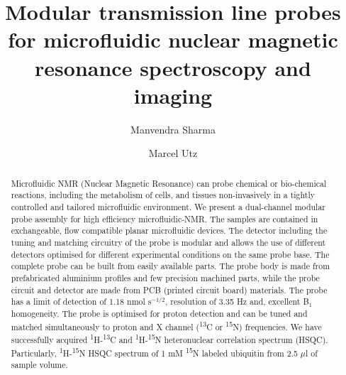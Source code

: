 \documentclass[preprint,5p]{elsarticle}
\begin{document}
\title{Modular transmission line probes for microfluidic nuclear magnetic resonance spectroscopy and imaging}
\author[1]{Manvendra Sharma}
\author[1]{Marcel Utz}
\address[1]{School of Chemistry, University of Southampton, Southampton SO17 1BJ, United Kingdom}
\begin{abstract}
Microfluidic NMR (Nuclear Magnetic Resonance) can probe chemical or bio-chemical reactions, including the metabolism of cells, and tissues non-invasively in a tightly controlled and tailored microfluidic environment. We present a dual-channel modular probe assembly for  high efficiency microfluidic-NMR. The samples are contained in exchangeable, flow compatible planar microfluidic devices. The detector including the tuning and matching circuitry of the probe is modular and allows the use of different detectors optimised for different experimental conditions on the same probe base. The complete probe can be built from easily available parts. The probe body is made from prefabricated aluminium profiles and few precision machined parts, while the probe circuit and detector are made from PCB (printed circuit board) materials. The probe has a limit of detection of 1.18 nmol s$^{-1/2}$, resolution of 3.35 Hz and, excellent B$_{1}$ homogeneity. The probe is optimised for proton detection and can be tuned and matched simultaneously to proton and X channel (\textsuperscript{13}C or \textsuperscript{15}N) frequencies. We have successfully acquired \textsuperscript{1}H-\textsuperscript{13}C and \textsuperscript{1}H-\textsuperscript{15}N heteronuclear correlation spectrum (HSQC). Particularly, \textsuperscript{1}H-\textsuperscript{15}N HSQC spectrum of 1 mM \textsuperscript{15}N labeled ubiquitin from 2.5 $\mu$l of sample volume.
\end{abstract}
\maketitle
\end{document}
